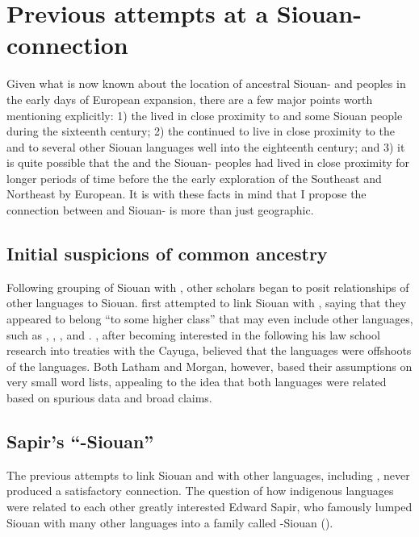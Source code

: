 \documentclass[output=paper]{LSP/langsci}
\begin{document}
\section{Previous attempts at a Siouan- connection}\label{sec:kasak:3}

Given what is now known about the location of ancestral Siouan- and  peoples in the early days of European expansion, there are a few major points worth mentioning explicitly: 1) the  lived in close proximity to  and some Siouan people during the sixteenth century; 2) the  continued to live in close proximity to the  and to several other Siouan languages well into the eighteenth century; and 3) it is quite possible that the  and the Siouan- peoples had lived in close proximity for longer periods of time before the the early exploration of the Southeast and Northeast by European. It is with these facts in mind that I propose the connection between  and Siouan- is more than just geographic.

\subsection{Initial suspicions of common ancestry}

Following  grouping of Siouan with , other scholars began to posit relationships of other languages to Siouan. \citet{Latham1856} first attempted to link Siouan with , saying that they appeared to belong ``to some higher class'' that may even include other languages, such as , , , and . \citet{Morgan1871}, after becoming interested in the  following his law school research into treaties with the Cayuga, believed that the  languages were offshoots of the  languages. Both Latham and Morgan, however, based their assumptions on very small word lists, appealing to the idea that both languages were related based on spurious data and broad claims.

\subsection{Sapir's ``-Siouan''}

The previous attempts to link Siouan and  with other languages, including , never produced a satisfactory connection. The question of how indigenous languages were related to each other greatly interested Edward Sapir, who famously lumped Siouan with many other languages into a family called -Siouan (\citealt{Sapir1929}). 
\end{document}
